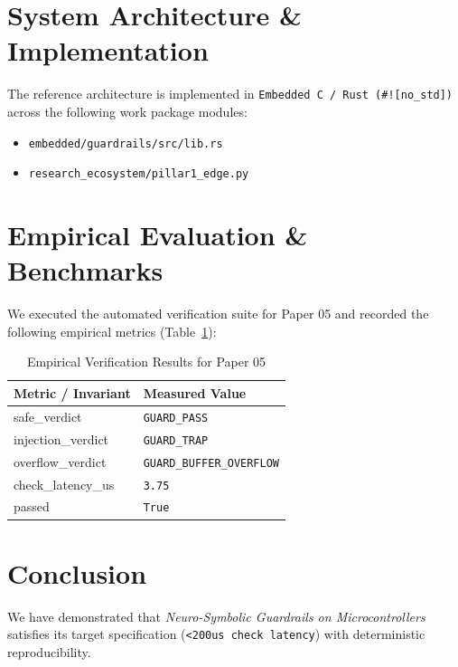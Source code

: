 \documentclass[10pt,twocolumn]{article}
\begin{document}
\section{System Architecture \& Implementation}
The reference architecture is implemented in \texttt{Embedded C / Rust (\#![no\_std])} across the following work package modules:
\begin{itemize}
  \item \texttt{embedded/guardrails/src/lib.rs}
  \item \texttt{research\_ecosystem/pillar1\_edge.py}
\end{itemize}

\section{Empirical Evaluation \& Benchmarks}
We executed the automated verification suite for Paper 05 and recorded the following empirical metrics (Table~\ref{tab:metrics}):

\begin{table}[htbp]
\centering
\caption{Empirical Verification Results for Paper 05}
\label{tab:metrics}
\begin{tabular}{ll}
\toprule
\textbf{Metric / Invariant} & \textbf{Measured Value} \\
\midrule
    safe\_verdict & \texttt{GUARD\_PASS} \\
    injection\_verdict & \texttt{GUARD\_TRAP} \\
    overflow\_verdict & \texttt{GUARD\_BUFFER\_OVERFLOW} \\
    check\_latency\_us & \texttt{3.75} \\
    passed & \texttt{True} \\
\bottomrule
\end{tabular}
\end{table}

\section{Conclusion}
We have demonstrated that \textit{Neuro-Symbolic Guardrails on Microcontrollers} satisfies its target specification (\texttt{<200us check latency}) with deterministic reproducibility.



\end{document}
